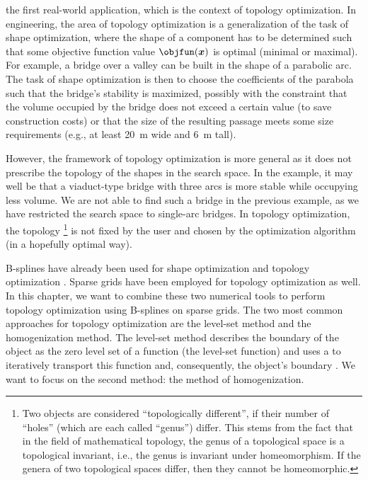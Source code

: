 
\label{chap:60topoOpt}

the first real-world application,
which is the context of topology optimization.
In engineering,
the area of topology optimization is a generalization of the
task of shape optimization, where the shape of a component has to be
determined such that some objective function value $\objfun(\*x)$ is optimal
(minimal or maximal).
For example, a bridge over a valley can be built in the shape of a
parabolic arc.
The task of shape optimization is then to choose the coefficients of the
parabola such that the bridge's stability is maximized,
possibly with the constraint that the volume occupied by the bridge
does not exceed a certain value (to save construction costs) or
that the size of the resulting passage meets some size requirements
(e.g., at least \SI{20}{\meter} wide and \SI{6}{\meter} tall).

However, the framework of topology optimization is more general as
it does not prescribe the topology
of the shapes in the search space.
In the example, it may well be that a viaduct-type bridge with three arcs
is more stable while occupying less volume.
We are not able to find such a bridge in the previous example,
as we have restricted the search space to single-arc bridges.
In topology optimization, the topology%
\footnote{%
  Two objects are considered ``topologically different'',
  if their number of ``holes'' (which are each called ``genus'') differ.
  This stems from the fact that in the field of mathematical topology,
  the genus of a topological space is a topological invariant, i.e.,
  the genus is invariant under homeomorphism.
  If the genera of two topological spaces differ, then they cannot be
  homeomorphic.%
}
is not fixed by the user
and chosen by the optimization algorithm (in a hopefully optimal way).

B-splines have already been used for
shape optimization \cite{Martin16Formoptimierung} and
topology optimization .
Sparse grids have been employed for
topology optimization \cite{Huebner14Mehrdimensionale} as well.
In this chapter, we want to combine these two numerical tools
to perform topology optimization using B-splines on sparse grids.
The two most common approaches for topology optimization are
the level-set method and the homogenization method.
The level-set method describes the boundary of the object
as the zero level set of a function (the level-set function)
and uses a \pde to iteratively transport this function and,
consequently, the object's boundary \cite{Allaire04Topology}.
We want to focus on the second method: the method of homogenization.

